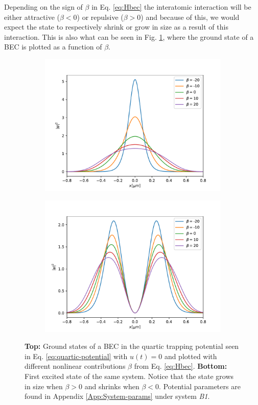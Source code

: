 \documentclass[a4paper, twocolumn]{revtex4-1}
\begin{document}
Depending on the sign of $\beta$ in Eq. \eqref{eq:Hbec} the interatomic interaction will be either attractive ($\beta<0$) or repulsive ($\beta>0$) and because of this, we would expect the state to respectively shrink or grow in size as a result of this interaction. This is also what can be seen in Fig. \ref{fig:BECstates}, where the ground state of a BEC is plotted as a function of $\beta$.
\begin{figure}[h]
	\begin{subfigure}{\columnwidth}
		\includegraphics[width=\columnwidth]{graphics/stateAnalysis/GroundstateBeta.pdf}
	\end{subfigure}
	\begin{subfigure}{\columnwidth}
		\includegraphics[width=\columnwidth]{graphics/stateAnalysis/ExcitedstateBeta.pdf}
	\end{subfigure}
	\caption{\textbf{Top:} Ground states of a BEC in the quartic trapping potential seen in Eq. \eqref{eq:quartic-potential} with $u(t)=0$ and plotted with different nonlinear contributions $\beta$ from Eq. \eqref{eq:Hbec}. \textbf{Bottom:} First excited state of the same system. Notice that the state grows in size when $\beta > 0$ and shrinks when $\beta < 0$. Potential parameters are found in Appendix \ref{App:System-params} under system \textit{B1}.}
	\label{fig:BECstates}
\end{figure}
\end{document}
